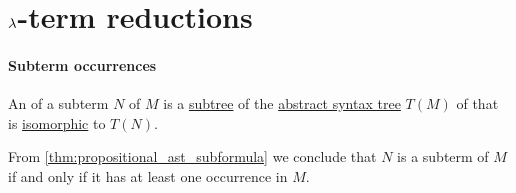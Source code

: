 \section{\texorpdfstring{\( {\mathrm \lambda} \)}{λ}-term reductions}\label{sec:lambda_term_reductions}

\paragraph{Subterm occurrences}

\begin{definition}\label{def:lambda_subterm_occurrence}\mimprovised
  An  of a subterm \( N \) of \( M \) is a \hyperref[def:tree/subtree]{subtree} of the \hyperref[con:abstract_syntax_tree]{abstract syntax tree} \( T(M) \) of that is \hyperref[def:labeled_tree/homomorphism]{isomorphic} to \( T(N) \).
\end{definition}
\begin{comments}
  \item From \cref{thm:propositional_ast_subformula} we conclude that \( N \) is a subterm of \( M \) if and only if it has at least one occurrence in \( M \).
\end{comments}

